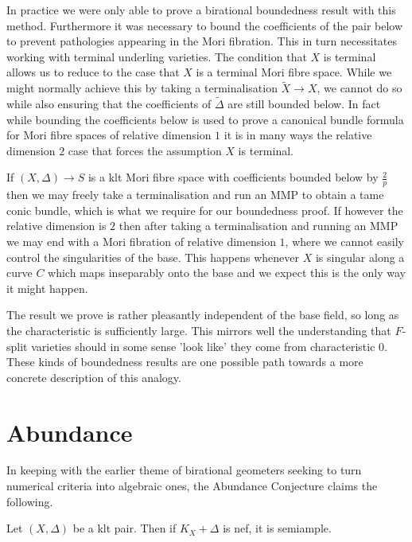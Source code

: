 \documentclass[a4paper,12pt]{book}
\let \OldSection \section
\renewcommand{\section}[1]{\OldSection{#1} \thispagestyle{section}}
\newcommand{\D}{\Delta}
\begin{document}
	
	In practice we were only able to prove a birational boundedness result with this method. Furthermore it was necessary to bound the coefficients of the pair below to prevent pathologies appearing in the Mori fibration. This in turn necessitates working with terminal underling varieties. The condition that $X$ is terminal allows us to reduce to the case that $X$ is a terminal Mori fibre space. While we might normally achieve this by taking a terminalisation $\tilde{X} \to X$, we cannot do so while also ensuring that the coefficients of $\tilde{\D}$ are still bounded below. In fact while bounding the coefficients below is used to prove a canonical bundle formula for Mori fibre spaces of relative dimension $1$ it is in many ways the relative dimension $2$ case that forces the assumption $X$ is terminal.
	
	If $(X,\Delta) \to S$ is a klt Mori fibre space with coefficients bounded below by $\frac{2}{p}$ then we may freely take a terminalisation and run an MMP to obtain a tame conic bundle, which is what we require for our boundedness proof. If however the relative dimension is $2$ then after taking a terminalisation and running an MMP we may end with a Mori fibration of relative dimension $1$, where we cannot easily control the singularities of the base. This happens whenever $X$ is singular along a curve $C$ which maps inseparably onto the base and we expect this is the only way it might happen. 
	
	
	The result we prove is rather pleasantly independent of the base field, so long as the characteristic is sufficiently large. This mirrors well the understanding that $F$-split varieties should in some sense 'look like' they come from characteristic $0$. These kinds of boundedness results are one possible path towards a more concrete description of this analogy.
	
	

	\section{Abundance}
	
	In keeping with the earlier theme of birational geometers seeking to turn numerical criteria into algebraic ones, the Abundance Conjecture claims the following.
	
	\begin{conjecture*}
		
		Let $(X,\Delta)$ be a klt pair. Then if $K_{X}+\Delta$ is nef, it is semiample.	
		\end{conjecture*}
	
\end{document}
